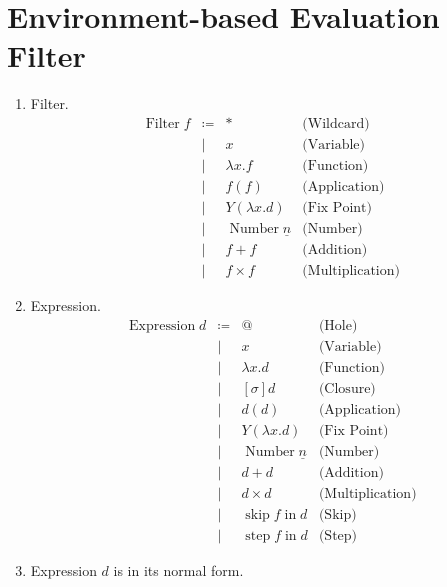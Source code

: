 \documentclass{article}
\newcommand{\final}{~\mathbf{final}}
\newcommand{\class}[1]{\operatorname{#1}}
\DeclareMathOperator{\fskip}{skip}
\DeclareMathOperator{\fstep}{step}
\newcommand{\fin}{\mathrel{\mathop{\text{in}}}}
\newcommand{\flet}{\mathrm{let}~}
\begin{document}
\section{Environment-based Evaluation Filter}

\begin{enumerate}
  \item {} Filter.
    \[
      \begin{array}{rcll}
        \class{Filter} f
        &\coloneqq& \ast & \text{(Wildcard)}\\
        &\mid& x & \text{(Variable)}\\
        &\mid& \lambda x . f & \text{(Function)}\\
        &\mid& f(f) & \text{(Application)}\\
        &\mid& Y (\lambda x . d) & \text{(Fix Point)}\\
        &\mid& \class{Number} \underline{n} & \text{(Number)}\\
        &\mid& f + f & \text{(Addition)} \\
        &\mid& f \times f & \text{(Multiplication)}
      \end{array}
    \]
  \item {} Expression.
    \[
      \begin{array}{rcll}
        \class{Expression} d
        &\coloneqq& @ & \text{(Hole)} \\
        &\mid& x & \text{(Variable)} \\
        &\mid& \lambda x . d & \text{(Function)} \\
        &\mid& [\sigma] d & \text{(Closure)} \\
        &\mid& d (d) & \text{(Application)} \\
        &\mid& Y (\lambda x . d) & \text{(Fix Point)}\\
        &\mid& \class{Number} \underline{n} & \text{(Number)} \\
        &\mid& d + d & \text{(Addition)} \\
        &\mid& d \times d & \text{(Multiplication)} \\
        &\mid& \fskip f \fin d & \text{(Skip)}\\
        &\mid& \fstep f \fin d & \text{(Step)}
      \end{array}
    \]
  \item \fbox{\(d \final\)} Expression \(d\) is in its normal form. 


\end{enumerate}
\end{document}
